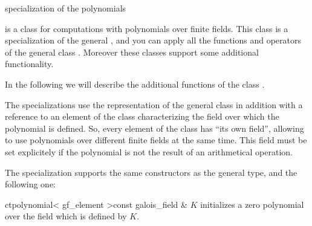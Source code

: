 


\NAME

 \dotfill specialization of the polynomials



\ABSTRACT

 is a class for computations with polynomials over finite fields.
This class is a specialization of the general , and you can apply all the
functions and operators of the general class .  Moreover these classes
support some additional functionality.

In the following we will describe the additional functions of the class .



\DESCRIPTION

The specializations use the representation of the general class  in
addition with a reference to an element of the class  characterizing the
field over which the polynomial is defined.  So, every element of the class  has ``its own field'', allowing to use polynomials over different finite fields
at the same time.  This field must be set explicitely if the polynomial is not the result of an
arithmetical operation.



\CONS

The specialization supports the same constructors as the general type, and the following one:

\begin{fcode}{ct}{polynomial< gf_element >}{const galois_field & $K$}
  initializes a zero polynomial over the field which is defined by $K$.
\end{fcode}


